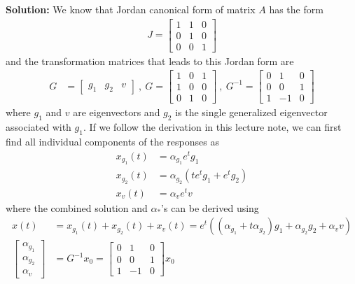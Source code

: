\documentclass[twoside]{article}
\begin{document}
\textbf{Solution:} We know that Jordan canonical form of matrix $A$ has the form
%
\begin{align*}
  J = \left[ \begin{array}{ccc} 1 & 1 & 0 \\ 0 & 1 & 0 \\ 0 & 0 & 1 \end{array} \right] 
\end{align*}
% 
and the transformation matrices that leads to this Jordan form are
%
\begin{align*}
 G &= \left[ \begin{array}{cccc} g_1 & g_2 & v  \end{array} \right]
 \ , \ 
 G = \left[ \begin{array}{ccc} 1 & 0 & 1 \\ 1 & 0 & 0  \\ 0 & 1 & 0  \end{array} \right]
 \  , \ 
 G^{-1} = \left[ \begin{array}{ccc} 0 & 1 & 0 \\ 0 & 0 & 1  \\ 1 & -1 & 0 \end{array} \right]
\end{align*}
%
where $g_1$ and $v$ are eigenvectors and $g_2$ is the single generalized eigenvector associated with $g_1$.
If we follow the derivation in this lecture note, we can first find all individual components of the responses as
%
\begin{align*}
 x_{g_1}(t) &= \alpha_{g_1} e^{t} g_1  
 \\
 x_{g_2}(t) &= \alpha_{g_2} \left( t e^{t} g_1  + e^{t} g_2 \right)
 \\
 x_{v}(t) &= \alpha_{v} e^{t} v  
\end{align*}
%
where the combined solution and $\alpha_{*}$'s can be derived using
%
\begin{align*}
x(t) &=  x_{g_1}(t) +  x_{g_2}(t) +  x_{v}(t)  = e^{t} \left( (\alpha_{g_1} + t \alpha_{g_2})g_1 + \alpha_{g_2}  g_2 + \alpha_{v} v  \right) 
\\
\left[ \begin{array}{ccc} \alpha_{g_1} \\ \alpha_{g_2} \\ \alpha_{v} \end{array} \right] &= G^{-1} x_0 = \left[ \begin{array}{ccc} 0 & 1 & 0 \\ 0 & 0 & 1  \\ 1 & -1 & 0 \end{array} \right] x_0
\end{align*}
\end{document}
